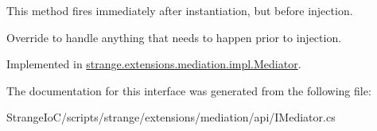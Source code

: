 This method fires immediately after instantiation, but before injection. 

Override to handle anything that needs to happen prior to injection. 

Implemented in \hyperlink{classstrange_1_1extensions_1_1mediation_1_1impl_1_1_mediator_a014246a5f07c3685e5d567700dd94d7a}{strange.\-extensions.\-mediation.\-impl.\-Mediator}.



The documentation for this interface was generated from the following file\-:\begin{DoxyCompactItemize}
\item 
Strange\-Io\-C/scripts/strange/extensions/mediation/api/I\-Mediator.\-cs\end{DoxyCompactItemize}
